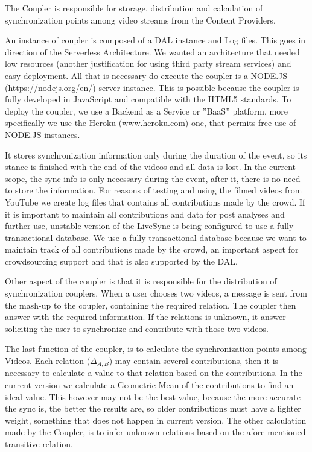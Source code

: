The Coupler is responsible for storage, distribution and calculation of synchronization points among video streams from the Content Providers.

An instance of coupler is composed of a DAL instance and Log files. This goes in direction of the Serverless Architecture. We wanted an architecture that needed low resources (another justification for using third party stream services) and easy deployment. All that is necessary do execute the coupler is a NODE.JS (https://nodejs.org/en/) server instance. This is possible because the coupler is fully developed in JavaScript and compatible with the HTML5 standards. To deploy the coupler, we use a Backend as a Service or ”BaaS” platform, more specifically we use the Heroku (www.heroku.com) one, that permits free use of NODE.JS instances.

It stores synchronization information only during the duration of the event, so its stance is finished with the end of the videos and all data is lost. In the current scope, the sync info is only necessary during the event, after it, there is no need to store the information. For reasons of testing and using the filmed videos from YouTube we create log files that contains all contributions made by the crowd. If it is important to maintain all contributions and data for post analyses and further use, unstable version of the LiveSync is being configured to use a fully transactional database. We use a fully transactional database because we want to maintain track of all contributions made by the crowd, an important aspect for crowdsourcing support and that is also supported by the DAL.

Other aspect of the coupler is that it is responsible for the distribution of synchronization couplers. When a user chooses two videos, a message is sent from the mash-up to the coupler, containing the required relation. The coupler then answer with the required information. If the relations is unknown, it answer soliciting the user to synchronize and contribute with those two videos.

The last function of the coupler, is to calculate the synchronization points among Videos. Each relation ($\Delta_{A,B}$) may contain several contributions, then it is necessary to calculate a value to that relation based on the contributions. In the current version we calculate a Geometric Mean of the contributions to find an ideal value. This however may not be the best value, because the more accurate the sync is, the better the results are, so older contributions must have a lighter weight, something that does not happen in current version. The other calculation made by the Coupler, is to infer unknown relations based on the afore mentioned transitive relation.

